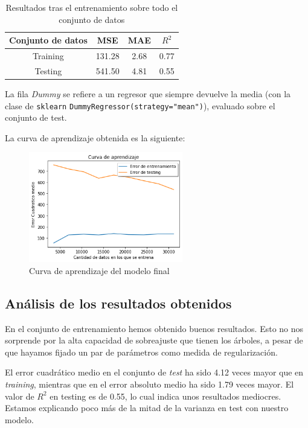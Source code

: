 \documentclass[11pt]{article}
\begin{document}
\begin{table}[H]
    \centering
    \begin{tabular}{|c|c|c|c|}
    \hline
    \textbf{Conjunto de datos}  & \textbf{MSE} & \textbf{MAE} & \textbf{$R^2$} \\
    \hline
    Training & 131.28  & 2.68 & 0.77 \\
    Testing  & 541.50  & 4.81 & 0.55 \\
    \hline
    \end{tabular}
    \caption{Resultados tras el entrenamiento sobre todo el conjunto de datos}
\end{table}

La fila \emph{Dummy} se refiere a un regresor que siempre devuelve la media (con la clase de \lstinline{sklearn} \lstinline{DummyRegressor(strategy="mean")}), evaluado sobre el conjunto de test.

La curva de aprendizaje obtenida es la siguiente:

\begin{figure}[H]
  \centering
  \includegraphics[width=0.6\textwidth]{curva_aprendizaje}
  \caption{Curva de aprendizaje del modelo final}
\end{figure}

\subsection{Análisis de los resultados obtenidos}

En el conjunto de entrenamiento hemos obtenido buenos resultados. Esto no nos sorprende por la alta capacidad de sobreajuste que tienen los árboles, a pesar de que hayamos fijado un par de parámetros como medida de regularización.

El error cuadrático medio en el conjunto de \emph{test} ha sido 4.12 veces mayor que en \emph{training}, mientras que en el error absoluto medio ha sido 1.79 veces mayor. El valor de $R^2$ en testing es de 0.55, lo cual indica unos resultados mediocres. Estamos explicando poco más de la mitad de la varianza en test con nuestro modelo.
\end{document}

